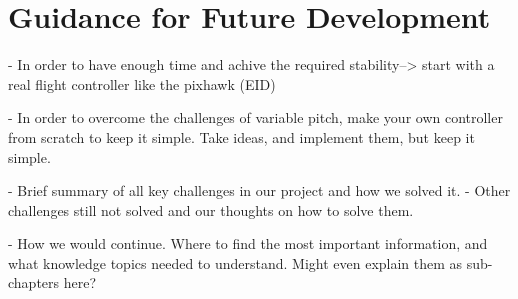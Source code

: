 \section{Guidance for Future Development}
 
 
 - In order to have enough time and achive the required stability--> start with a real flight controller like the pixhawk (EID)
 
 - In order to overcome the challenges of variable pitch, make your own controller from scratch to keep it simple. Take ideas, and implement them, but keep it simple. 
 
 - Brief summary of all key challenges in our project and how we solved it. 
 - Other challenges still not solved and our thoughts on how to solve them.
 
 - How we would continue. Where to find the most important information, and what knowledge topics needed to understand. Might even explain them as sub-chapters here?